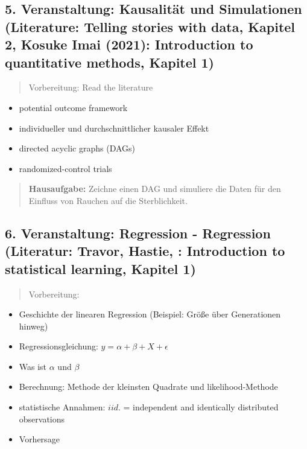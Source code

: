 \subsection{5. Veranstaltung: Kausalität und Simulationen (Literature:
Telling stories with data, Kapitel 2, Kosuke Imai (2021): Introduction
to quantitative methods, Kapitel
1)}\label{veranstaltung-kausalituxe4t-und-simulationen-literature-telling-stories-with-data-kapitel-2-kosuke-imai-2021-introduction-to-quantitative-methods-kapitel-1}

\begin{quote}
Vorbereitung: Read the literature
\end{quote}

\begin{itemize}
\tightlist
\item
  potential outcome framework
\item
  individueller und durchschnittlicher kausaler Effekt
\item
  directed acyclic graphs (DAGs)
\item
  randomized-control trials
\end{itemize}

\begin{quote}
\textbf{Hausaufgabe:} Zeichne einen DAG und simuliere die Daten für den
Einfluss von Rauchen auf die Sterblichkeit.
\end{quote}

\subsection{6. Veranstaltung: Regression - Regression (Literatur:
Travor, Hastie, : Introduction to statistical learning, Kapitel
1)}\label{veranstaltung-regression---regression-literatur-travor-hastie-introduction-to-statistical-learning-kapitel-1}

\begin{quote}
Vorbereitung:
\end{quote}

\begin{itemize}
\tightlist
\item
  Geschichte der linearen Regression (Beispiel: Größe über Generationen
  hinweg)
\item
  Regressionsgleichung: \(y=\alpha + \beta + X + \epsilon\)
\item
  Was ist \(\alpha\) und \(\beta\)
\item
  Berechnung: Methode der kleinsten Quadrate und likelihood-Methode
\item
  statistische Annahmen: \(iid.\) = independent and identically
  distributed observations
\item
  Vorhersage
\end{itemize}


